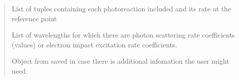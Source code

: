 \documentclass[letterpaper,10pt,english]{sphinxmanual}
\begin{document}
\begin{fulllineitems}
\begin{quote}
\begin{description}
\begin{description}
\sphinxAtStartPar
List of tuples containing each photoreaction included and its rate at
the reference point

\sphinxAtStartPar
List of wavelengths for which there are photon scattering rate
coefficients (\sphinxhyphen{}values) or electron impact excitation rate
coefficients.

\sphinxAtStartPar
Object from
saved in case there is additional infomation the user might need.

\end{description}

\end{description}\end{quote}


\end{fulllineitems}
\end{document}
